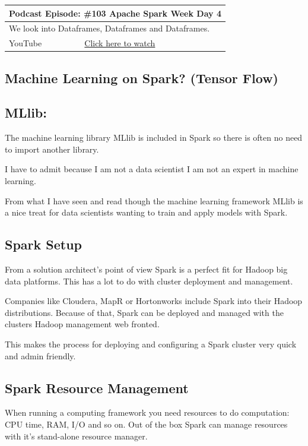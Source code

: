 \documentclass[12pt, numbers=noenddot]{scrreprt} %
\begin{document}
\begin{table}[h]
\begin{tabular}{ll}
\hline
\multicolumn{2}{l}{\textbf{Podcast Episode:} \#103 Apache Spark Week Day 4} \\ \hline
\multicolumn{2}{p{15cm}}{We look into Dataframes, Dataframes and Dataframes.}         \\ \hline
\multicolumn{1}{l|}{YouTube}   & \href{https://youtu.be/9I6mA2W6_HU}{Click here to watch}   \\ \hline
\end{tabular}
\end{table}


\subsection{Machine Learning on Spark? (Tensor Flow)}

\subsection{MLlib:} The machine learning library MLlib is included in Spark so there is often no need to import another library.

I have to admit because I am not a data scientist I am not an expert in machine learning.

From what I have seen and read though the machine learning framework MLlib is a nice treat for data scientists wanting to train and apply models with Spark.

\subsection{Spark Setup}
From a solution architect’s point of view Spark is a perfect fit for Hadoop big data platforms. This has a lot to do with cluster deployment and management.

Companies like Cloudera, MapR or Hortonworks include Spark into their Hadoop distributions. Because of that, Spark can be deployed and managed with the clusters Hadoop management web fronted.

This makes the process for deploying and configuring a Spark cluster very quick and admin friendly.

\subsection{Spark Resource Management}
When running a computing framework you need resources to do computation: CPU time, RAM, I/O and so on. Out of the box Spark can manage resources with it’s stand-alone resource manager.
\end{document}
